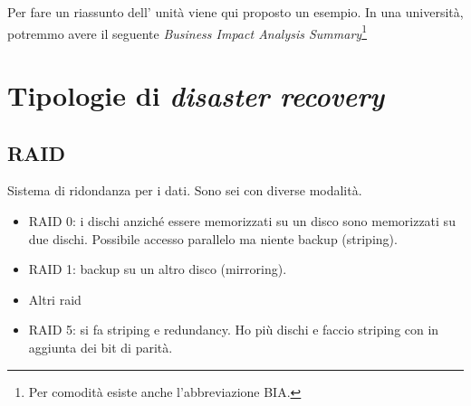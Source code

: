 Per fare un riassunto dell' unità viene qui proposto un esempio. In una
università, potremmo avere il seguente \textit{Business Impact Analysis
Summary}\footnote{Per comodità esiste anche l'abbreviazione BIA.}

\begin{table}[H]
\centering
{}
\caption{Un esempio di BIA per una Università}
\end{table}


\section{Tipologie di \textit{disaster recovery}}

\subsection{RAID}

Sistema di ridondanza per i dati. Sono sei con diverse modalità.
\begin{itemize}
  \item RAID 0: i dischi anziché essere memorizzati su un disco sono
  memorizzati su due dischi. Possibile accesso parallelo ma niente backup
  (striping).

  \item RAID 1: backup su un altro disco (mirroring).

  \item Altri raid

  \item RAID 5: si fa striping e redundancy. Ho più dischi e faccio striping
  con in aggiunta dei bit di parità.

\end{itemize}


